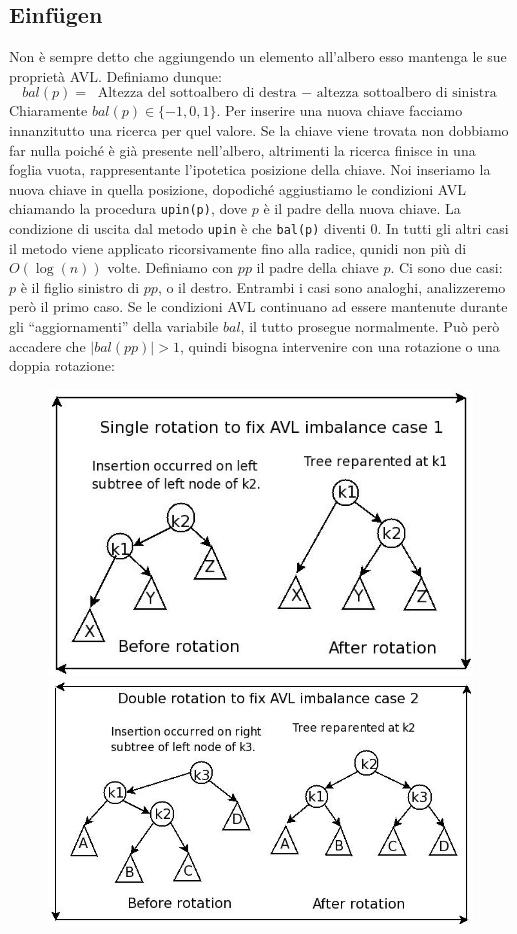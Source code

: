 \documentclass[a4paper]{book}
\newcommand{\inline}[1]{\lstinline!#1!}%
\begin{document}
\subsection*{Einfügen}
Non è sempre detto che aggiungendo un elemento all'albero esso mantenga le sue proprietà AVL. Definiamo dunque:
$$ bal(p)=\mbox{ Altezza del sottoalbero di destra $-$ altezza sottoalbero di sinistra}$$
Chiaramente $bal(p) \in \{-1,0,1\}$. Per inserire una nuova chiave facciamo innanzitutto una ricerca per quel valore. Se la chiave viene trovata non dobbiamo far nulla poiché è già presente nell'albero, altrimenti la ricerca finisce in una foglia vuota, rappresentante l'ipotetica posizione della chiave. Noi inseriamo la nuova chiave in quella posizione, dopodiché aggiustiamo le condizioni AVL chiamando la procedura \inline{upin(p)}, dove $p$ è il padre della nuova chiave. La condizione di uscita dal metodo \inline{upin} è che \inline{bal(p)} diventi 0. In tutti gli altri casi il metodo viene applicato ricorsivamente fino alla radice, qunidi non più di $O(\log(n))$ volte. Definiamo con $pp$ il padre della chiave $p$. Ci sono due casi: $p$ è il figlio sinistro di $pp$, o il destro. Entrambi i casi sono analoghi, analizzeremo però il primo caso. Se le condizioni AVL continuano ad essere mantenute durante gli ``aggiornamenti'' della variabile $bal$, il tutto prosegue normalmente. Può però accadere che $|bal(pp)|>1$, quindi bisogna intervenire con una rotazione o una doppia rotazione:
\begin{figure}[H]
\centering
\includegraphics[scale=0.6]{Figures/singlerot.jpg}
\includegraphics[scale=0.55]{Figures/doublerot.jpg}
\end{figure}
\end{document}
